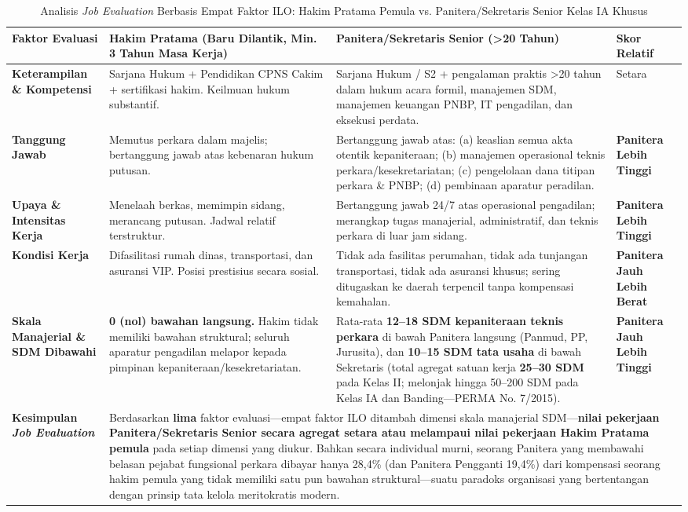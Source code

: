 \documentclass[12pt, a4paper]{article}
\begin{document}
\begin{table}[H]
\centering
\fontsize{9}{11}\selectfont
\caption{Analisis \textit{Job Evaluation} Berbasis Empat Faktor ILO: Hakim Pratama Pemula vs. Panitera/Sekretaris Senior Kelas IA Khusus}
\label{tab:job-evaluation}
\renewcommand{\arraystretch}{1.35}
\begin{tabular}{p{3.0cm} p{4.3cm} p{4.3cm} p{2.5cm}}
\hline
\textbf{Faktor Evaluasi} & \textbf{Hakim Pratama (Baru Dilantik, Min. 3 Tahun Masa Kerja)} & \textbf{Panitera/Sekretaris Senior (>20 Tahun)} & \textbf{Skor Relatif} \tabularnewline
\hline
\raggedright\textbf{Keterampilan \& Kompetensi} & Sarjana Hukum + Pendidikan CPNS Cakim + sertifikasi hakim. Keilmuan hukum substantif. & Sarjana Hukum / S2 + pengalaman praktis >20 tahun dalam hukum acara formil, manajemen SDM, manajemen keuangan PNBP, IT pengadilan, dan eksekusi perdata. & Setara \tabularnewline
\raggedright\textbf{Tanggung Jawab} & Memutus perkara dalam majelis; bertanggung jawab atas kebenaran hukum putusan. & Bertanggung jawab atas: (a) keaslian semua akta otentik kepaniteraan; (b) manajemen operasional teknis perkara/kesekretariatan; (c) pengelolaan dana titipan perkara \& PNBP; (d) pembinaan aparatur peradilan. & \raggedright\textbf{Panitera Lebih Tinggi} \tabularnewline
\raggedright\textbf{Upaya \& Intensitas Kerja} & Menelaah berkas, memimpin sidang, merancang putusan. Jadwal relatif terstruktur. & Bertanggung jawab 24/7 atas operasional pengadilan; merangkap tugas manajerial, administratif, dan teknis perkara di luar jam sidang. & \raggedright\textbf{Panitera Lebih Tinggi} \tabularnewline
\raggedright\textbf{Kondisi Kerja} & Difasilitasi rumah dinas, transportasi, dan asuransi VIP. Posisi prestisius secara sosial. & Tidak ada fasilitas perumahan, tidak ada tunjangan transportasi, tidak ada asuransi khusus; sering ditugaskan ke daerah terpencil tanpa kompensasi kemahalan. & \raggedright\textbf{Panitera Jauh Lebih Berat} \tabularnewline
\raggedright\textbf{Skala Manajerial \& SDM Dibawahi} & \textbf{0 (nol) bawahan langsung.} Hakim tidak memiliki bawahan struktural; seluruh aparatur pengadilan melapor kepada pimpinan kepaniteraan/kesekretariatan. & Rata-rata \textbf{12--18 SDM kepaniteraan teknis perkara} di bawah Panitera langsung (Panmud, PP, Jurusita), dan \textbf{10--15 SDM tata usaha} di bawah Sekretaris (total agregat satuan kerja \textbf{25--30 SDM} pada Kelas II; melonjak hingga 50--200 SDM pada Kelas IA dan Banding---PERMA No. 7/2015). & \raggedright\textbf{Panitera Jauh Lebih Tinggi} \tabularnewline
\hline
\raggedright\textbf{Kesimpulan \textit{Job Evaluation}} & \multicolumn{3}{p{11.1cm}}{Berdasarkan \textbf{lima} faktor evaluasi---empat faktor ILO ditambah dimensi skala manajerial SDM---\textbf{nilai pekerjaan Panitera/Sekretaris Senior secara agregat setara atau melampaui nilai pekerjaan Hakim Pratama pemula} pada setiap dimensi yang diukur. Bahkan secara individual murni, seorang Panitera yang membawahi belasan pejabat fungsional perkara dibayar hanya 28,4\% (dan Panitera Pengganti 19,4\%) dari kompensasi seorang hakim pemula yang tidak memiliki satu pun bawahan struktural---suatu paradoks organisasi yang bertentangan dengan prinsip tata kelola meritokratis modern.} \tabularnewline

\end{tabular}
\end{table}
\end{document}
